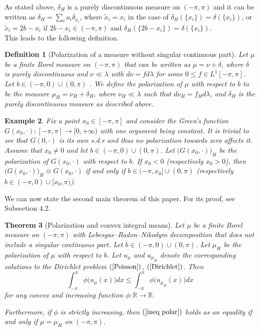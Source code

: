 \documentclass[11pt]{amsart}
\newtheorem{theorem}{Theorem}[section]
\newtheorem{example}[theorem]{Example}
\newtheorem{definition}[theorem]{Definition}
\numberwithin{equation}{section}
\begin{document}
As stated above, \(\delta_H\) is a purely discontinuous measure on \((-\pi,\pi)\) and it can be written as \(\delta_H=\sum_i a_i\delta_{\tilde{x}_i}\), where \(\tilde{x}_i=x_i\) in the case of \(\delta_H(\{x_i\})=\delta(\{x_i\})\), or \(\tilde{x}_i=2b-x_i\) if \(2b-x_i\in(-\pi,\pi)\) and \(\delta_H(\{2b-x_i\})=\delta(\{x_i\})\).\\
This leads to the following definition.
\begin{definition}[Polarization of a measure without singular continuous part]\label{polar measure}\textnormal{
Let \(\mu\) be a finite Borel measure on \((-\pi,\pi)\) that can be written as \(\mu=\nu+\delta\), where \(\delta\) is purely discontinuous and \(\nu\ll\lambda\) with \(d\nu=fd\lambda\) for some \(0\leq f\in L^1[-\pi,\pi]\). Let \(b\in(-\pi,0)\cup(0,\pi)\) . We define the polarization of \(\mu\) with respect to \(b\) to be the measure \(\mu_H=\nu_H+\delta_H\), where \(\nu_H\ll\lambda\) such that \(d\nu_H=f_H d\lambda\), and \(\delta_H\) is the purely discontinuous measure as described above.}
\end{definition}
\begin{example}\label{paradeigma}\textnormal{
Fix a point \(x_0\in[-\pi,\pi]\) and consider the Green's function \(G(x_0,\cdot):[-\pi,\pi]\to[0,+\infty)\) with one argument being constant. It is trivial to see that \(G(0,\cdot)\) is its own s.d.r and thus no polarization towards zero affects it. Assume that \(x_0\neq0\) and let \(b\in(-\pi,0)\cup(0,\pi)\). Let \(\bigl(G(x_0,\cdot)\bigr)_H\) be the polarization of \(G(x_0,\cdot)\) with respect to \(b\). If \(x_0<0\) (respectively \(x_0>0\)), then \(\bigl(G(x_0,\cdot)\bigr)_H\equiv G(x_0,\cdot)\) if and only if \(b\in(-\pi,x_0]\cup(0,\pi)\) (respectively \(b\in(-\pi,0)\cup[x_0,\pi)\)).}
\end{example}
We can now state the second main theorem of this paper. For its proof, see Subsection 4.2.
\begin{theorem}[Polarization and convex integral means]\label{polarconvex}
Let \(\mu\) be a finite Borel measure on \((-\pi,\pi)\) with Lebesgue--Radon--Nikodym decomposition that does not include a singular continuous part. Let \(b\in(-\pi,0)\cup(0,\pi)\). Let \(\mu_H\) be the polarization of \(\mu\) with respect to \(b\). Let \(u_\mu\) and \(u_{\mu_H}\) denote the corresponding solutions to the Dirichlet problem \((\ref{Poisson})\), \((\ref{Dirichlet})\). Then
\begin{equation}\label{ineq polar}
\int_{-\pi}^\pi \phi\bigl(u_\mu(x)\bigr)dx\leq\int_{-\pi}^\pi \phi\bigl(u_{\mu_H}(x)\bigr)dx
\end{equation}
for any convex and increasing function \(\phi:\mathbb{R}\to\mathbb{R}.\)
\par Furthermore, if \(\phi\) is strictly increasing, then \((\ref{ineq polar})\) holds as an equality if and only if \(\mu=\mu_H\) on \((-\pi,\pi)\).
\end{theorem}
\end{document}
